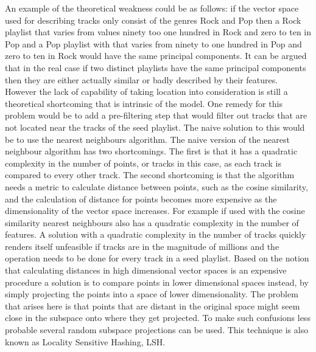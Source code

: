 \documentclass[a4paper,11pt]{kth-mag}
\begin{document}
 An example of the theoretical weakness could be as follows: if the vector space used for describing tracks only consist of the genres Rock and Pop then a Rock playlist that varies from values ninety too one hundred in Rock and zero to ten in Pop and a Pop playlist with that varies from ninety to one hundred in Pop and zero to ten in Rock would have the same principal components. It can be argued that in the real case if two distinct playlists have the same principal components then they are either actually similar or badly described by their features. However the lack of capability of taking location into consideration is still a theoretical shortcoming that is intrinsic of the model. One remedy for this problem would be to add a pre-filtering step that would filter out tracks that are not located near the tracks of the seed playlist. The naive solution to this would be to use the nearest neighbours algorithm. The naive version of the nearest neighbour algorithm has two shortcomings. The first is that it has a quadratic complexity in the number of points, or tracks in this case, as each track is compared to every other track. The second shortcoming is that the algorithm needs a metric to calculate distance between points, such as the cosine similarity, and the calculation of distance for points becomes more expensive as the dimensionality of the vector space increases. For example if used with the cosine similarity nearest neighbours also has a quadratic complexity in the number of features. A solution with a quadratic complexity in the number of tracks quickly renders itself unfeasible if tracks are in the magnitude of millions and the operation needs to be done for every track in a seed playlist. 
Based on the notion that calculating distances in high dimensional vector spaces is an expensive procedure a solution is to compare points in lower dimensional spaces instead, by simply projecting the points into a space of lower dimensionality. The problem that arises here is that points that are distant in the original space might seem close in the subspace onto where they get projected. To make such confusions less probable several random subspace projections can be used. This technique is also known as Locality Sensitive Hashing, LSH.
\end{document}

